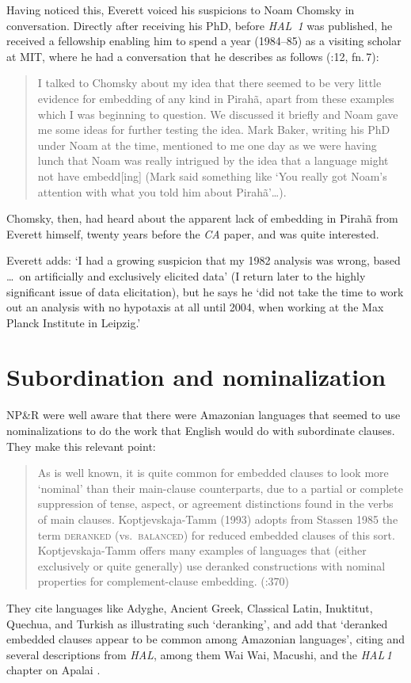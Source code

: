 \documentclass[output=paper,colorlinks,citecolor=brown
]{langscibook}
\begin{document}
Having noticed this, Everett voiced his suspicions to Noam Chomsky in
conversation. Directly after receiving his PhD, before \textit{HAL~1}
was published, he received a fellowship enabling him to spend a year
(1984--85) as a visiting scholar at MIT, where he had a conversation
that he describes as follows (\citealt{Everett07}:12, fn.\,7):
\begin{quote}
I talked to Chomsky about my idea that there seemed to be very
little evidence for embedding of any kind in Pirahã, apart from
these \mbox{} examples which I was beginning to question.
We discussed it briefly and Noam gave me some ideas for further
testing the idea. Mark Baker, writing his PhD under Noam at
the time, mentioned to me one day as we were having lunch that Noam
was really intrigued by the idea that a language might not have
embedd[ing] (Mark said something like `You really got Noam's
attention with what you told him about Pirah{\~a}'\ldots).
\end{quote}
Chomsky, then, had heard about the apparent lack of embedding in
Pirah{\~a} from Everett himself, twenty years before the \textit{CA}
paper, and was quite interested.

Everett adds: `I had a growing suspicion that my 1982 analysis was
wrong, based \ldots\ on artificially and exclusively elicited data'
(I return later to the highly significant issue of data elicitation),
but he says he `did not take the time to work out an analysis with
no hypotaxis at all until 2004, when working at the Max Planck
Institute in Leipzig.'

\section{Subordination and nominalization}

NP\&R were well aware that there were Amazonian languages that seemed
to use nominalizations to do the work that English would do with
subordinate clauses. They make this relevant point:
\begin{quote}
As is well known, it is quite common for embedded clauses to look
more `nominal' than their main-clause counterparts, due to a partial
or complete suppression of tense, aspect, or agreement distinctions
found in the verbs of main clauses. Koptjevskaja-Tamm (1993) adopts
from Stassen 1985 the term \textsc{deranked} (vs.\ \textsc{balanced})
for reduced embedded clauses of this sort. Koptjevskaja-Tamm offers
many examples of languages that (either exclusively or quite generally)
use deranked constructions with nominal properties for complement-clause
embedding.
(\citealt{NevPesRod09a}:370)
\end{quote}
They cite languages like Adyghe, Ancient Greek, Classical Latin, Inuktitut,
Quechua, and Turkish as illustrating such `deranking', and add that
`deranked embedded clauses appear to be common among Amazonian languages',
citing \citet{Derbyshire87} and several descriptions from \textit{HAL},
among them Wai Wai, Macushi, and the \textit{HAL\,1} chapter on Apalai
\citep{Koehn86}.
\end{document}

